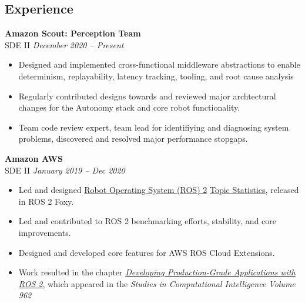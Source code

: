 \documentclass[11pt,twoside,a4paper]{article}
\begin{document}
{\begin{multicols}{2}
            \section*{Experience}
            \noindent
                \textbf{Amazon Scout: Perception Team}\\
                SDE II \hfill \textsl{December 2020 -- Present} \\
                \vspace{ -10px}
                \begin{itemize}[noitemsep,nolistsep]
	           \item Designed and implemented cross-functional middleware abstractions to enable determinism,  replayability, latency tracking, tooling, and root cause analysis
                    \item Regularly contributed designs towards and reviewed major archtectural changes for the Autonomy stack and core robot functionality.
		  \item Team code review expert, team lead for identifiying and diagnosing system problems, discovered and resolved major performance stopgaps.
                \end{itemize}
                \vspace{10px}
                \textbf{Amazon AWS}\\
                SDE II \hfill \textsl{January 2019 -- Dec 2020} \\
                \vspace{ -10px}
                \begin{itemize}[noitemsep,nolistsep]
	           \item Led and designed \href{https://docs.ros.org/}{Robot Operating System (ROS) 2} \href{https://docs.ros.org/en/rolling/Concepts/About-Topic-Statistics.html}{Topic Statistics}, released in ROS 2 Foxy.	
                    \item Led and contributed to ROS 2 benchmarking efforts, stability, and core improvements.
                    \item Designed and developed core features for AWS ROS Cloud Extensions.
                    \item Work resulted in the chapter \href{https://link.springer.com/chapter/10.1007/978-3-030-75472-3_1}{\textit{Developing Production-Grade Applications with ROS 2}}, which appeared in the \textit{Studies in Computational Intelligence Volume 962}

\end{itemize}
\end{multicols}}
\end{document}
